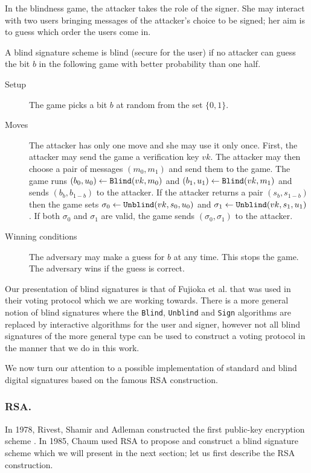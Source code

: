 \documentclass{llncs}
\newcommand{\alg}[1]{\textup{\texttt{#1}}}
\begin{document}
In the blindness game, the attacker takes the role of the signer. She may
interact with two users bringing messages of the attacker's choice to be signed;
her aim is to guess which order the users come in.

\begin{definition}
A blind signature scheme is blind (secure for the user) if no attacker can guess
the bit $b$ in the following game with better probability than one half.

\begin{description}
\item[Setup]
The game picks a bit $b$ at random from the set $\{0, 1\}$.

\item[Moves]
The attacker has only one move and she may use it only once. First, the attacker
may send the game a verification key $vk$. The attacker may then choose a pair
of messages $(m_0, m_1)$ and send them to the game.
The game runs $(b_0, u_0) \gets \alg{Blind}(vk, m_0)$ and
$(b_1, u_1) \gets \alg{Blind}(vk, m_1)$ and sends $(b_b, b_{1-b})$ to the
attacker. If the attacker returns a pair $(s_b, s_{1-b})$ then the game sets
$\sigma_0 \gets \alg{Unblind}(vk, s_0, u_0)$ and
$\sigma_1 \gets \alg{Unblind}(vk, s_1, u_1)$. If both $\sigma_0$ and $\sigma_1$
are valid, the game sends $(\sigma_0, \sigma_1)$ to the attacker.

\item[Winning conditions]
The adversary may make a guess for $b$ at any time. This stops the game.
The adversary wins if the guess is correct.
\end{description}
\end{definition}

Our presentation of blind signatures is that of Fujioka et al. \cite{FOO92}
that was used in their voting protocol which we are working towards. There is a
more general notion of blind signatures where the \alg{Blind}, \alg{Unblind} and
\alg{Sign} algorithms are replaced by interactive algorithms for the user and
signer, however not all blind signatures of the more general type can be used
to construct a voting protocol in the manner that we do in this work.

We now turn our attention to a possible implementation of standard and blind
digital signatures based on the famous RSA construction.

\subsubsection{RSA.}
In 1978, Rivest, Shamir and Adleman constructed the first public-key encryption
scheme \cite{RSA78}. In 1985, Chaum used RSA to propose and construct a blind
signature scheme which we will present in the next section; let us first
describe the RSA construction.
\end{document}

